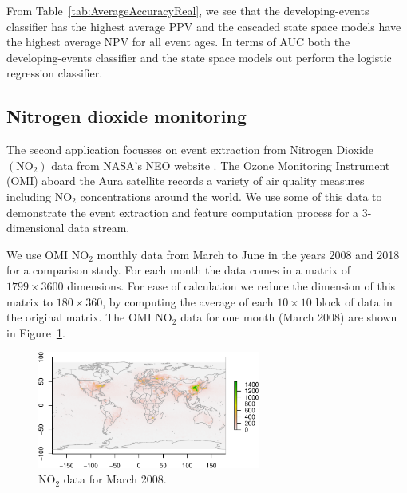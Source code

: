 \documentclass[a4paper,11pt]{article}
\begin{document}
From Table~\ref{tab:AverageAccuracyReal}, we see that the developing-events classifier has the highest average PPV and the cascaded state space models have the highest average NPV for all event ages. In terms of AUC both the developing-events classifier and the state space models out perform the logistic regression classifier.

\newpage
\subsection{Nitrogen dioxide monitoring}

The second application focusses on event extraction from Nitrogen Dioxide $(\text{NO}_2)$ data from NASA's NEO website \cite{OMINO2}. The Ozone Monitoring Instrument (OMI) \cite{levelt2006ozone} aboard the Aura satellite records a variety of air quality measures including $\text{NO}_2$ concentrations around the world. We use some of this data to demonstrate the event extraction and feature computation process for a 3-dimensional data stream.

We use OMI $\text{NO}_2$ monthly data from March to June in the years 2008 and 2018 for a comparison study. For each month the data comes in a matrix of $1799 \times 3600$ dimensions. For ease of calculation we reduce the dimension of this matrix to $180 \times 360 $, by computing the average of each $10 \times 10$ block of data in the original matrix. The OMI $\text{NO}_2$ data for one month (March 2008) are shown in Figure~\ref{fig:NO2March2008}.

\begin{figure}[!htb]
	\centering
		\includegraphics[width=0.65\textwidth]{./Graphics/NO2_March_2008_With_Bndry.pdf}
	\caption{$\text{NO}_2$ data for March 2008.}
	\label{fig:NO2March2008}
\end{figure}
\end{document}
